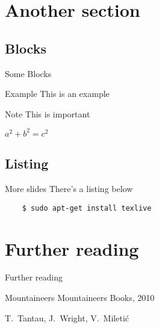 \documentclass[compress]{beamer}
\begin{document}
\section{Another section}
\subsection{Blocks}
\begin{frame}{Some Blocks}
    \begin{exampleblock}{Example}
        This is an example
    \end{exampleblock}
    
    \begin{alertblock}{Note}
        This is important
    \end{alertblock}

    \begin{theorem}[Pythagoras] 
        $ a^2 + b^2 = c^2$
    \end{theorem}
\end{frame}

\subsection{Listing}
\begin{frame}[containsverbatim]{More slides}
    There's a listing below
    \lstset{language=bash}
    \begin{lstlisting}
    $ sudo apt-get install texlive
    \end{lstlisting}%
\end{frame}

\section{Further reading}
\begin{frame}{Further reading}
	\begin{thebibliography}{10}
    
	\beamertemplatebookbibitems
	Mountaineers
	\newblock {}
	\newblock Mountaineers Books, 2010

	\beamertemplatearticlebibitems
	T.~Tantau, J.~Wright, V.~Miletić
	\newblock {}
  \end{thebibliography}
\end{frame}
\end{document}
